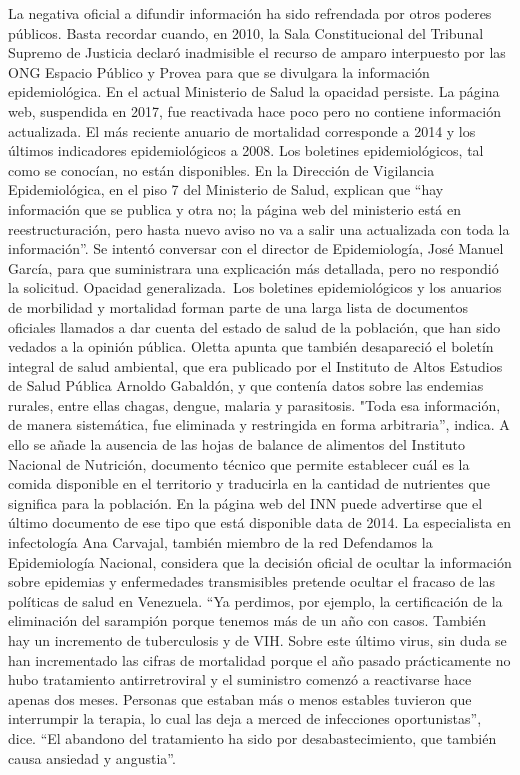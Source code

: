 \documentclass{article}%
\begin{document}
\newline%
%
La negativa oficial a difundir información ha sido refrendada por otros poderes públicos. Basta recordar cuando, en 2010, la Sala Constitucional del Tribunal Supremo de Justicia declaró inadmisible el recurso de amparo interpuesto por las ONG Espacio Público y Provea para que se divulgara la información epidemiológica.%
\newline%
%
En el actual Ministerio de Salud la opacidad persiste. La página web, suspendida en 2017, fue reactivada hace poco pero no contiene información actualizada. El más reciente anuario de mortalidad corresponde a 2014 y los últimos indicadores epidemiológicos a 2008. Los boletines epidemiológicos, tal como se conocían, no están disponibles. En la Dirección de Vigilancia Epidemiológica, en el piso 7 del Ministerio de Salud, explican que “hay información que se publica y otra no; la página web del ministerio está en reestructuración, pero hasta nuevo aviso no va a salir una actualizada con toda la información”. Se intentó conversar con el director de Epidemiología, José Manuel García, para que suministrara una explicación más detallada, pero no respondió la solicitud.%
\newline%
%
Opacidad generalizada.~Los boletines epidemiológicos y los anuarios de morbilidad y mortalidad forman parte de una larga lista de documentos oficiales llamados a dar cuenta del estado de salud de la población, que han sido vedados a la opinión pública. Oletta apunta que también desapareció el boletín integral de salud ambiental, que era publicado por el Instituto de Altos Estudios de Salud Pública Arnoldo Gabaldón, y que contenía datos sobre las endemias rurales, entre ellas chagas, dengue, malaria y parasitosis. "Toda esa información, de manera sistemática, fue eliminada y restringida en forma arbitraria”, indica.%
\newline%
%
A ello se añade la ausencia de las hojas de balance de alimentos del Instituto Nacional de Nutrición, documento técnico que permite establecer cuál es la comida disponible en el territorio y traducirla en la cantidad de nutrientes que significa para la población. En la página web del INN puede advertirse que el último documento de ese tipo que está disponible data de 2014.%
\newline%
%
La especialista en infectología Ana Carvajal, también miembro de la red Defendamos la Epidemiología Nacional, considera que la decisión oficial de ocultar la información sobre epidemias y enfermedades transmisibles pretende ocultar el fracaso de las políticas de salud en Venezuela. “Ya perdimos, por ejemplo, la certificación de la eliminación del sarampión porque tenemos más de un año con casos. También hay un incremento de tuberculosis y de VIH. Sobre este último virus, sin duda se han incrementado las cifras de mortalidad porque el año pasado prácticamente no hubo tratamiento antirretroviral y el suministro comenzó a reactivarse hace apenas dos meses. Personas que estaban más o menos estables tuvieron que interrumpir la terapia, lo cual las deja a merced de infecciones oportunistas”, dice. “El abandono del tratamiento ha sido por desabastecimiento, que también causa ansiedad y angustia”.%
\end{document}
